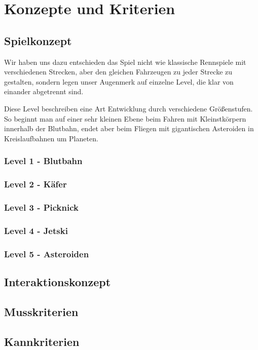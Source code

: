 \section{Konzepte und Kriterien}

\subsection{Spielkonzept}

Wir haben uns dazu entschieden das Spiel nicht wie klassische Rennspiele mit verschiedenen Strecken, aber den gleichen Fahrzeugen zu jeder Strecke zu gestalten, sondern legen unser Augenmerk auf einzelne Level, die klar von einander abgetrennt sind.

Diese Level beschreiben eine Art Entwicklung durch verschiedene Größenstufen.
So beginnt man auf einer sehr kleinen Ebene beim Fahren mit Kleinstkörpern innerhalb der Blutbahn, endet aber beim Fliegen mit gigantischen Asteroiden in Kreislaufbahnen um Planeten.

\subsubsection{Level 1 - Blutbahn}

\subsubsection{Level 2 - Käfer}

\subsubsection{Level 3 - Picknick}

\subsubsection{Level 4 - Jetski}

\subsubsection{Level 5 - Asteroiden}

\subsection{Interaktionskonzept}

\subsection{Musskriterien}

\subsection{Kannkriterien}
